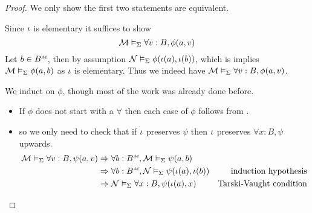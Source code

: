 \begin{proof}
    We only show the first two statements are equivalent.
    \begin{forward}
        Since $\iota$ is elementary it suffices to show 
        \[\mathcal{M} \vDash_{\Sigma} \forall v : B, \phi(a,v)\]
        Let $b \in \mmintp{B}$, 
        then by assumption $\mathcal{N} \vDash_{\Sigma} \phi(\iota(a),\iota(b))$,
        which is implies $\mathcal{M} \vDash_{\Sigma} \phi(a,b)$
        as $\iota$ is elementary.
        Thus we indeed have $\mathcal{M} \vDash_{\Sigma} \forall v : B, \phi(a,v)$.
    \end{forward}

    \begin{backward}
        We induct on $\phi$, 
        though most of the work was already done before.
        \begin{itemize}
            \item If $\phi$ does not start with a $\forall$ 
            then each case of $\phi$ follows from 
            .

            \item {}
                so we only need to check that if $\iota$ preserves 
                $\psi$ then $\iota$ preserves $\forall x : B, \psi$ upwards.
            \begin{align*}
                \MM \model{\Si} \forall v : B, \psi (a,v) &
                    \implies \forall b : \mmintp{B}, \MM \model{\Si} \psi(a,b)\\
                    &\implies \forall b : \mmintp{B},
                        \NN \model{\Si} \psi(\io(a),\io(b))
                        & \text{induction hypothesis}\\
                    &\implies \NN \model{\Si} \forall x : B, \psi(\io(a),x)
                        & \text{Tarski-Vaught condition}
            \end{align*}
        \end{itemize}
    \end{backward}
\end{proof}

